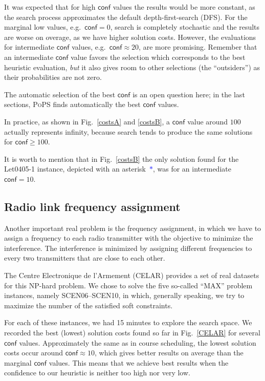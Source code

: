 \documentclass{ws-ijait}
\begin{document}
It was expected that for high $\mathsf{conf}$ values the
results would be more constant, as the search process
approximates the default depth-first-search (DFS). For the
marginal low values, e.g.\ $\mathsf{conf} = 0$, search is
completely stochastic and the results are worse on overage,
as we have higher solution costs. However, the evaluations
for intermediate $\mathsf{conf}$ values, e.g.\ 
$\mathsf{conf} \approx 20$, are more promising. Remember
that an intermediate $\mathsf{conf}$ value favors the
selection which corresponds to the best heuristic
evaluation, \emph{but} it also gives room to other
selections (the ``outsiders'') as their probabilities are
not zero.

The automatic selection of the best $\mathsf{conf}$ is an
open question here; in the last sections, \textsc{PoPS}
finds automatically the best $\mathsf{conf}$ values.

In practice, as shown in Fig.\ \ref{costsA} and
\ref{costsB}, a $\mathsf{conf}$ value around $100$ actually
represents infinity, because search tends to produce the
same solutions for $\mathsf{conf} \geq 100$.

It is worth to mention that in Fig.~\ref{costsB} the only
solution found for the \textsf{Let0405-1} instance, depicted
with an asterisk~\textcolor{blue}{$*$}, was for an
intermediate $\mathsf{conf} = 10$.

\subsection{Radio link frequency assignment}

Another important real problem is the frequency assignment,
in which we have to assign a frequency to each radio
transmitter with the objective to minimize the interference.
The interference is minimized by assigning different
frequencies to every two transmitters that are close to each
other.

The Centre Electronique de l'Armement (CELAR) provides a set
of real datasets for this NP-hard problem.\cite{Cabon1999}
We chose to solve the five so-called ``MAX'' problem
instances, namely \textsf{SCEN06}--\textsf{SCEN10}, in
which, generally speaking, we try to maximize the number of
the satisfied soft constraints.

For each of these instances, we had 15 minutes to explore
the search space. We recorded the best (lowest) solution
costs found so far in Fig.~\ref{CELAR} for several
$\mathsf{conf}$ values. Approximately the same as in course
scheduling, the lowest solution costs occur around
$\mathsf{conf} \approx 10$, which gives better results on
average than the marginal $\mathsf{conf}$ values. This means
that we achieve best results when the confidence to our
heuristic is neither too high nor very low.
\end{document}
